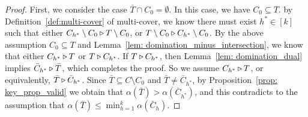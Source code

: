 \begin{proof}
First, we consider the case $\bar T \cap C_0 = \emptyset$.
In this case, we have $C_0 \subseteq T$. 
%
%
by Definition~\ref{def:multi-cover} of multi-cover, we know there must exist $h^* \in [k]$ such that either $C_{h^*} \setminus C_0 \triangleright  T \setminus C_0$, or $ T \setminus C_0 \triangleright C_{h^*} \setminus C_0$. By the above assumption $C_0 \subseteq T$ and Lemma~\ref{lem: domination_minus_intersection}, we know that either $C_{h^*} \triangleright T$ or $T \triangleright C_{h^*}$. If $T \triangleright C_{h^*}$, then Lemma~\ref{lem: domination_dual} implies $\bar C_{h^*} \triangleright \bar T$, which completes the proof. 
So we assume $C_{h^*} \triangleright T$, or equivalently, $\bar T \triangleright \bar C_{h^*}$. Since $\bar T \subseteq C \setminus C_0$ and $\bar T \neq \bar C_{h^*}$, by Proposition~\ref{prop: key_prop_valid} we obtain that $\alpha(\bar T) > \alpha(\bar C_{h^*})$, and this contradicts to the assumption that $\alpha(\bar T) \leq \min_{h=1}^k\alpha(\bar C_h)$. 


\end{proof}
